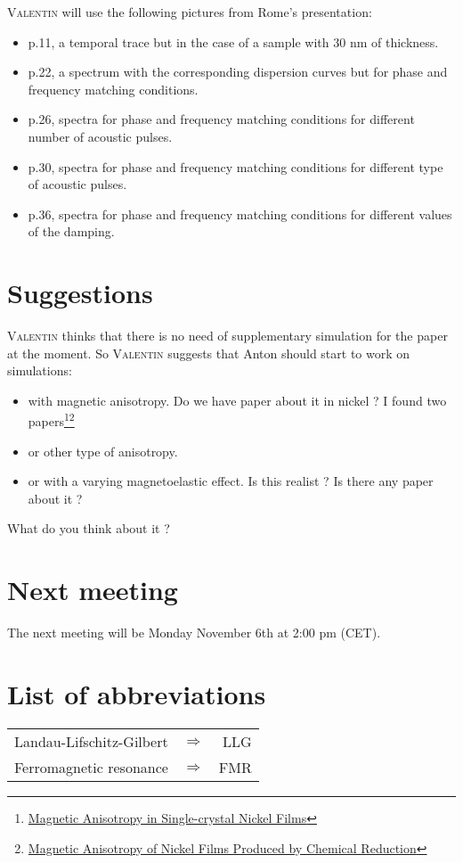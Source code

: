 \documentclass[12pt,a4paper]{article}
\newcommand{\valentin}{\textsc{Valentin} }
\begin{document}
\valentin will use the following pictures from Rome's presentation:
\begin{itemize}
    \item p.11, a temporal trace but in the case of a sample with 30 nm of thickness.
    \item p.22, a spectrum with the corresponding dispersion curves but for phase and frequency matching conditions.
    \item p.26, spectra for phase and frequency matching conditions for different number of acoustic pulses.
    \item p.30, spectra for phase and frequency matching conditions for different type of acoustic pulses.
    \item p.36, spectra for phase and frequency matching conditions for different values of the damping.
\end{itemize}

\section{Suggestions}

\valentin thinks that there is no need of supplementary simulation for the paper at the moment.
So \valentin suggests that Anton should start to work on simulations:
\begin{itemize}
    \item with magnetic anisotropy. Do we have paper about it in nickel ? I found two papers\footnote{\href{http://iopscience.iop.org/article/10.1088/0370-1328/78/1/305/pdf}{Magnetic Anisotropy in Single-crystal Nickel Films}}\footnote{\href{https://link.springer.com/content/pdf/10.1007\%2FBF01106052.pdf}{Magnetic Anisotropy of Nickel Films Produced by Chemical Reduction}}
    \item or other type of anisotropy.
    \item or with a varying magnetoelastic effect. Is this realist ? Is there any paper about it ?
\end{itemize}
What do you think about it ?

\section*{Next meeting}

The next meeting will be Monday November 6th at 2:00 pm (CET).

\newpage

\section*{List of abbreviations}

\begin{table}[ht]
    \begin{tabular}{ l c r }
        Landau-Lifschitz-Gilbert & $\Longrightarrow$ & LLG \\
        Ferromagnetic resonance & $\Longrightarrow$ & FMR \\
    \end{tabular}
\end{table}



\end{document}
